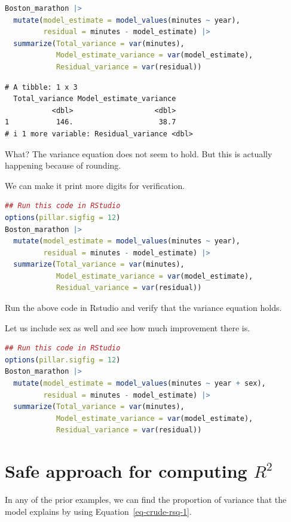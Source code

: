\documentclass[
  12pt,
  letterpaper,
  DIV=11,
  numbers=noendperiod]{scrreprt}
\begin{document}
\begin{lstlisting}[language=R]
Boston_marathon |> 
  mutate(model_estimate = model_values(minutes ~ year),
         residual = minutes - model_estimate) |> 
  summarize(Total_variance = var(minutes), 
            Model_estimate_variance = var(model_estimate), 
            Residual_variance = var(residual))
\end{lstlisting}

\begin{lstlisting}
# A tibble: 1 x 3
  Total_variance Model_estimate_variance
           <dbl>                   <dbl>
1           146.                    38.7
# i 1 more variable: Residual_variance <dbl>
\end{lstlisting}

What? The variance equation does not seem to hold. But this is actually
happening because of rounding.

We can make it print more digits for verification.

\begin{lstlisting}[language=R]
## Run this code in RStudio
options(pillar.sigfig = 12)
Boston_marathon |> 
  mutate(model_estimate = model_values(minutes ~ year),
         residual = minutes - model_estimate) |> 
  summarize(Total_variance = var(minutes), 
            Model_estimate_variance = var(model_estimate), 
            Residual_variance = var(residual))
\end{lstlisting}

Run the above code in Rstudio and verify that the variance equation
holds.

Let us include sex as well and see how much improvement there is.

\begin{lstlisting}[language=R]
## Run this code in RStudio
options(pillar.sigfig = 12)
Boston_marathon |> 
  mutate(model_estimate = model_values(minutes ~ year + sex),
         residual = minutes - model_estimate) |> 
  summarize(Total_variance = var(minutes), 
            Model_estimate_variance = var(model_estimate), 
            Residual_variance = var(residual))
\end{lstlisting}

\section{\texorpdfstring{Safe approach for computing
\(R^2\)}{Safe approach for computing R\^{}2}}\label{safe-approach-for-computing-r2}

In any of the prior examples, we can find the proportion of variance
that the model explains by using Equation~\ref{eq-crude-rsq-1}.
\end{document}
